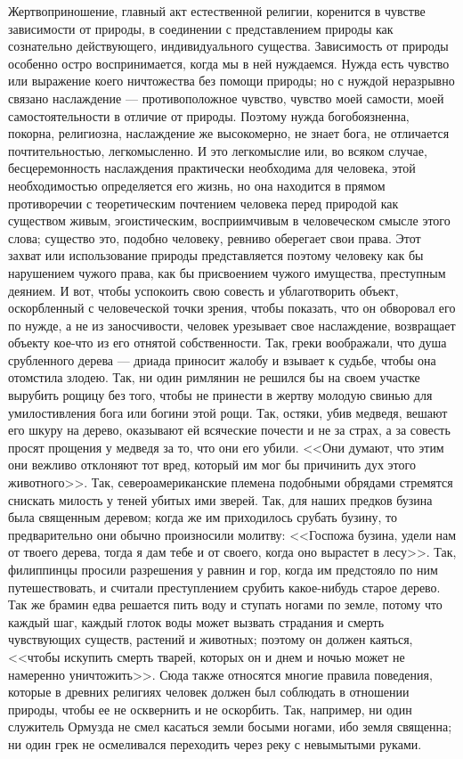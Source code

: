 \documentclass[12pt]{article}
\begin{document}
Жертвоприношение, главный акт естественной религии, коренится в чувстве зависимости от природы, в соединении с представлением природы как сознательно действующего, индивидуального существа. Зависимость от природы особенно остро воспринимается, когда мы в ней нуждаемся. Нужда есть чувство или выражение коего ничтожества без помощи природы; но с нуждой неразрывно связано наслаждение --- противоположное чувство, чувство моей самости, моей самостоятельности в отличие от природы. Поэтому нужда богобоязненна, покорна, религиозна, наслаждение же высокомерно, не знает бога, не отличается почтительностью, легкомысленно. И это легкомыслие или, во всяком случае, бесцеремонность наслаждения практически необходима для человека, этой необходимостью определяется его жизнь, но она находится в прямом противоречии с теоретическим почтением человека перед природой как существом живым, эгоистическим, восприимчивым в человеческом смысле этого слова; существо это, подобно человеку, ревниво оберегает свои права. Этот захват или использование природы представляется поэтому человеку как бы нарушением чужого права, как бы присвоением чужого имущества, преступным деянием. И вот, чтобы успокоить свою совесть и ублаготворить объект, оскорбленный с человеческой точки зрения, чтобы показать, что он обворовал его по нужде, а не из заносчивости, человек урезывает свое наслаждение, возвращает объекту кое-что из его отнятой собственности. Так, греки воображали, что душа срубленного дерева --- дриада приносит жалобу и взывает к судьбе, чтобы она отомстила злодею. Так, ни один римлянин не решился бы на своем участке вырубить рощицу без того, чтобы не принести в жертву молодую свинью для умилостивления бога или богини этой рощи. Так, остяки, убив медведя, вешают его шкуру на дерево, оказывают ей всяческие почести и не за страх, а за совесть просят прощения у медведя за то, что они его убили. <<Они думают, что этим они вежливо отклоняют тот вред, который им мог бы причинить дух этого животного>>. Так, североамериканские племена подобными обрядами стремятся снискать милость у теней убитых ими зверей. Так, для наших предков бузина была священным деревом; когда же им приходилось срубать бузину, то предварительно они обычно произносили молитву: <<Госпожа бузина, удели нам от твоего дерева, тогда я дам тебе и от своего, когда оно вырастет в лесу>>. Так, филиппинцы просили разрешения у равнин и гор, когда им предстояло по ним путешествовать, и считали преступлением срубить какое-нибудь старое дерево. Так же брамин едва решается пить воду и ступать ногами по земле, потому что каждый шаг, каждый глоток воды может вызвать страдания и смерть чувствующих существ, растений и животных; поэтому он должен каяться, <<чтобы искупить смерть тварей, которых он и днем и ночью может не намеренно уничтожить>>. Сюда также относятся многие правила поведения, которые в древних религиях человек должен был соблюдать в отношении природы, чтобы ее не осквернить и не оскорбить. Так, например, ни один служитель Ормузда не смел касаться земли босыми ногами, ибо земля священна; ни один грек не осмеливался переходить через реку с невымытыми руками.
\end{document}
